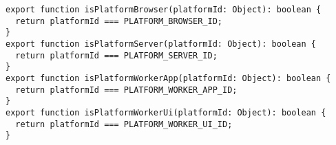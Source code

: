 \begin{verbatim}
export function isPlatformBrowser(platformId: Object): boolean {
  return platformId === PLATFORM_BROWSER_ID;
}
export function isPlatformServer(platformId: Object): boolean {
  return platformId === PLATFORM_SERVER_ID;
}
export function isPlatformWorkerApp(platformId: Object): boolean {
  return platformId === PLATFORM_WORKER_APP_ID;
}
export function isPlatformWorkerUi(platformId: Object): boolean {
  return platformId === PLATFORM_WORKER_UI_ID;
}
\end{verbatim}
